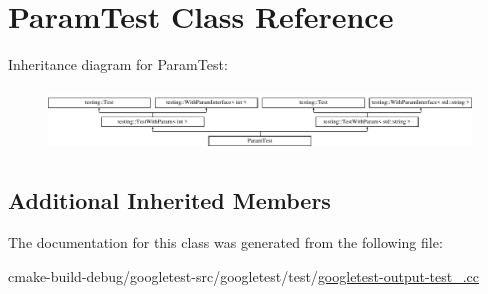 \hypertarget{classParamTest}{}\section{Param\+Test Class Reference}
\label{classParamTest}
Inheritance diagram for Param\+Test\+:\begin{figure}[H]
\begin{center}
\leavevmode
\includegraphics[height=1.686747cm]{classParamTest}
\end{center}
\end{figure}
\subsection*{Additional Inherited Members}


The documentation for this class was generated from the following file\+:\begin{DoxyCompactItemize}
\item 
cmake-\/build-\/debug/googletest-\/src/googletest/test/\mbox{\hyperlink{googletest-output-test___8cc}{googletest-\/output-\/test\+\_\+.\+cc}}\end{DoxyCompactItemize}
